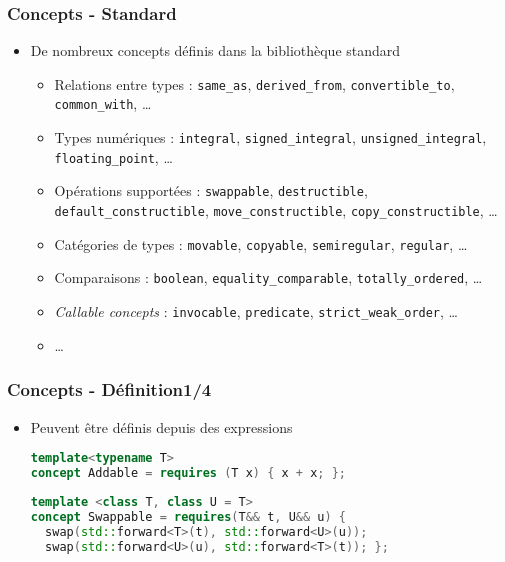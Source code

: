 \documentclass[C++.tex]{subfiles}
\begin{document}
\begin{frame}[fragile]
	\frametitle{Concepts - Standard}
	\begin{itemize}
		\item De nombreux concepts définis dans la bibliothèque standard


		\begin{itemize}
			\item Relations entre types : \lstinline|same_as|, \lstinline|derived_from|, \lstinline|convertible_to|, \lstinline|common_with|, \ldots
			\item Types numériques : \lstinline|integral|, \lstinline|signed_integral|, \lstinline|unsigned_integral|, \lstinline|floating_point|, \ldots
			\item Opérations supportées : \lstinline|swappable|, \lstinline|destructible|, \lstinline|default_constructible|, \lstinline|move_constructible|, \lstinline|copy_constructible|, \ldots
			\item Catégories de types : \lstinline|movable|, \lstinline|copyable|, \lstinline|semiregular|, \lstinline|regular|, \ldots


			\item Comparaisons : \lstinline|boolean|, \lstinline|equality_comparable|, \lstinline|totally_ordered|, \ldots
			\item \textit{Callable concepts} : \lstinline|invocable|, \lstinline|predicate|, \lstinline|strict_weak_order|, \ldots


			\item \ldots
		\end{itemize}
	\end{itemize}
\end{frame}

\begin{frame}[fragile]
	\frametitle{Concepts - Définition\titlehfill{}1/4}
	\begin{itemize}
		\item Peuvent être définis depuis des expressions

		\begin{lstlisting}[language=C++]
template<typename T>
concept Addable = requires (T x) { x + x; };\end{lstlisting}

		\begin{lstlisting}[language=C++]
template <class T, class U = T>
concept Swappable = requires(T&& t, U&& u) {
  swap(std::forward<T>(t), std::forward<U>(u));
  swap(std::forward<U>(u), std::forward<T>(t)); };\end{lstlisting}

	\end{itemize}
\end{frame}
\end{document}
